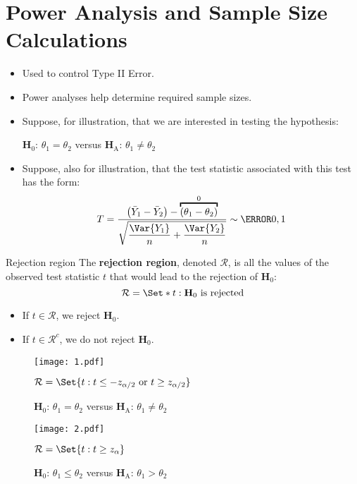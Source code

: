 \section{Power Analysis and Sample Size Calculations}
\begin{itemize}
    \item Used to control Type II Error.
    \item Power analyses help determine required sample sizes.
    \item Suppose, for illustration, that we are interested in testing the hypothesis:
          \begin{tightcenter}
              $ \mathbf{H}_0 $: $ \theta_1=\theta_2 $ versus $ \mathbf{H}_\text{A} $: $ \theta_1\ne \theta_2 $
          \end{tightcenter}
    \item Suppose, also for illustration, that the test statistic associated with this test has
          the form:
          \[ T=\frac{\bigl(\bar{Y}_1-\bar{Y}_2\bigr)-\overbracket{(\theta_1-\theta_2)}^0}{\displaystyle \sqrt{\frac{\Var{Y_1}}{n}+\frac{\Var{Y_2}}{n} }}\sim \N{0,1}  \]
\end{itemize}
\begin{Definition}{Rejection region}{}
    The \textbf{rejection region}, denoted $ \mathcal{R} $, is
    all the values of the observed test statistic $ t $ that would lead to the rejection
    of $ \mathbf{H}_0 $:
    \[ \mathcal{R}=\Set*{t\given \mathbf{H}_0\text{ is rejected}} \]
\end{Definition}
\begin{itemize}
    \item If $ t\in\mathcal{R} $, we reject $ \mathbf{H}_0 $.
    \item If $ t\in\mathcal{R}^c $, we do not reject $ \mathbf{H}_0 $.
\end{itemize}
\begin{figure}[!htbp]
    \centering
    \texttt{[image: 1.pdf]}
    \caption{$ \mathbf{H}_0 $: $ \theta_1=\theta_2 $ versus $ \mathbf{H}_\text{A} $: $ \theta_1\ne \theta_2 $}{$ \mathcal{R}=\Set{t\given t\le -z_{\alpha/2}\text{ or }t\ge z_{\alpha/2}} $}
\end{figure}
\begin{figure}[!htbp]
    \centering
    \texttt{[image: 2.pdf]}
    \caption{$ \mathbf{H}_0 $: $ \theta_1\le\theta_2 $ versus $ \mathbf{H}_\text{A} $: $ \theta_1>\theta_2 $}{$ \mathcal{R}=\Set{t\given t\ge z_{\alpha}} $}
\end{figure}
